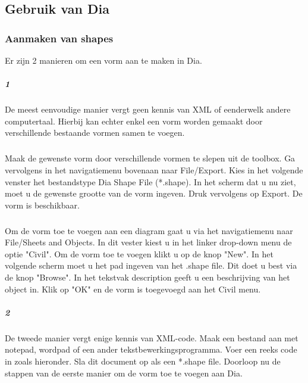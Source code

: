 \documentclass[12pt,a4paper]{report}
\begin{document}
\begin{flushleft}
\chapter*{Gebruik van Dia}
\subsection*{Aanmaken van shapes}
Er zijn 2 manieren om een vorm aan te maken in Dia.
\paragraph*{1}
De meest eenvoudige manier vergt geen kennis van XML of eenderwelk andere computertaal. Hierbij kan echter enkel een vorm worden gemaakt door verschillende bestaande vormen samen te voegen.
\paragraph*{}
Maak de gewenste vorm door verschillende vormen te slepen uit de toolbox. Ga vervolgens in het navigatiemenu bovenaan naar File/Export. Kies in het volgende venster het bestandstype Dia Shape File (*.shape). In het scherm dat u nu ziet, moet u de gewenste grootte van de vorm ingeven. 
\linebreak
\linebreak\linebreak
Druk vervolgens op Export. De vorm is beschikbaar.
\paragraph*{}
Om de vorm toe te voegen aan een diagram gaat u via het navigatiemenu naar File/Sheets and Objects. In dit vester kiest u in het linker drop-down menu de optie "Civil".
\linebreak
\linebreak
Om de vorm toe te voegen klikt u op de knop "New". In het volgende scherm moet u het pad ingeven van het .shape file. Dit doet u best via de knop "Browse".
\linebreak
\linebreak
 In het tekstvak description geeft u een beschrijving van het object in. Klik op "OK" en de vorm is toegevoegd aan het Civil menu.

\paragraph*{2}
De tweede manier vergt enige kennis van XML-code. 
Maak een bestand aan met notepad, wordpad of een ander tekstbewerkingsprogramma.
Voer een reeks code in zoals hieronder.
\linebreak
\linebreak
Sla dit document op als een *.shape file. Doorloop nu de stappen van de eerste manier om de vorm toe te voegen aan Dia.


\end{flushleft}
\end{document}
